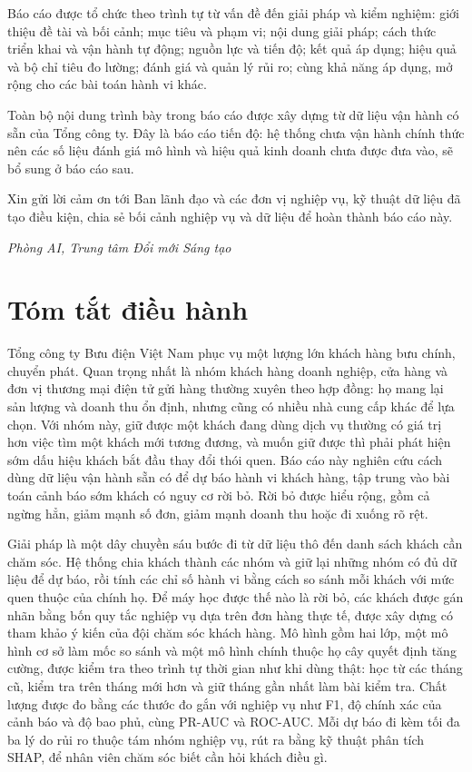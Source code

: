 Báo cáo được tổ chức theo trình tự từ vấn đề đến giải pháp và kiểm nghiệm: giới thiệu đề
tài và bối cảnh; mục tiêu và phạm vi; nội dung giải pháp; cách thức
triển khai và vận hành tự động; nguồn lực và tiến độ; kết quả áp dụng; hiệu quả và bộ chỉ
tiêu đo lường; đánh giá và quản lý rủi ro; cùng khả năng áp dụng, mở rộng cho các bài
toán hành vi khác.

Toàn bộ nội dung trình bày trong báo cáo được xây dựng từ dữ liệu vận hành có sẵn của Tổng
công ty. Đây là báo cáo tiến độ: hệ thống chưa vận hành chính thức nên các số liệu đánh giá
mô hình và hiệu quả kinh doanh chưa được đưa vào, sẽ bổ sung ở báo cáo sau.

Xin gửi lời cảm ơn tới Ban lãnh đạo và các đơn vị nghiệp vụ, kỹ thuật dữ liệu đã tạo điều
kiện, chia sẻ bối cảnh nghiệp vụ và dữ liệu để hoàn thành báo cáo này.

\vspace{1cm}
\begin{flushright}
\emph{Phòng AI, Trung tâm Đổi mới Sáng tạo}
\end{flushright}

\chapter*{Tóm tắt điều hành}
Tổng công ty Bưu điện Việt Nam phục vụ một lượng lớn khách hàng bưu chính, chuyển phát. Quan
trọng nhất là nhóm khách hàng doanh nghiệp, cửa hàng và đơn vị thương mại điện tử gửi hàng
thường xuyên theo hợp đồng: họ mang lại sản lượng và doanh thu ổn định, nhưng cũng có nhiều
nhà cung cấp khác để lựa chọn. Với nhóm này, giữ được một khách đang dùng dịch vụ thường có
giá trị hơn việc tìm một khách mới tương đương, và muốn giữ được thì phải phát hiện sớm dấu
hiệu khách bắt đầu thay đổi thói quen. Báo cáo này nghiên cứu cách dùng dữ liệu vận hành sẵn
có để dự báo hành vi khách hàng, tập trung vào bài toán cảnh báo sớm khách có nguy
cơ rời bỏ. Rời bỏ được hiểu rộng, gồm cả ngừng hẳn, giảm mạnh số đơn, giảm mạnh doanh thu
hoặc đi xuống rõ rệt.

Giải pháp là một dây chuyền sáu bước đi từ dữ liệu thô đến danh sách khách cần chăm sóc. Hệ
thống chia khách thành các nhóm và giữ lại những nhóm có đủ dữ liệu để dự báo, rồi tính các
chỉ số hành vi bằng cách so sánh mỗi khách với mức quen thuộc của chính họ. Để máy học được
thế nào là rời bỏ, các khách được gán nhãn bằng bốn quy tắc nghiệp vụ dựa trên đơn hàng
thực tế, được xây dựng có tham khảo ý kiến của đội chăm sóc khách hàng. Mô hình gồm hai lớp, một mô hình cơ sở làm mốc so sánh và một mô hình chính
thuộc họ cây quyết định tăng cường, được kiểm tra theo trình tự thời gian như khi
dùng thật: học từ các tháng cũ, kiểm tra trên tháng mới hơn và giữ tháng gần nhất làm bài kiểm tra. Chất lượng được đo bằng các thước đo gắn với nghiệp vụ như F1, độ chính xác của
cảnh báo và độ bao phủ, cùng PR-AUC và ROC-AUC. Mỗi dự báo đi kèm tối đa ba lý do rủi ro
thuộc tám nhóm nghiệp vụ, rút ra bằng kỹ thuật phân tích SHAP, để nhân viên chăm sóc biết
cần hỏi khách điều gì.

